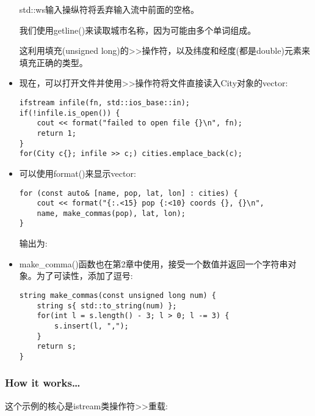 \begin{itemize}
std::ws输入操纵符将丢弃输入流中前面的空格。

我们使用getline()来读取城市名称，因为可能由多个单词组成。

这利用填充(unsigned long)的>{}>操作符，以及纬度和经度(都是double)元素来填充正确的类型。

\item 
现在，可以打开文件并使用>{}>操作符将文件直接读入City对象的vector:

\begin{lstlisting}[style=styleCXX]
ifstream infile(fn, std::ios_base::in);
if(!infile.is_open()) {
	cout << format("failed to open file {}\n", fn);
	return 1;
}
for(City c{}; infile >> c;) cities.emplace_back(c);
\end{lstlisting}

\item 
可以使用format()来显示vector:

\begin{lstlisting}[style=styleCXX]
for (const auto& [name, pop, lat, lon] : cities) {
	cout << format("{:.<15} pop {:<10} coords {}, {}\n",
	name, make_commas(pop), lat, lon);
}
\end{lstlisting}

输出为:


\item 
make\_comma()函数也在第2章中使用，接受一个数值并返回一个字符串对象。为了可读性，添加了逗号:

\begin{lstlisting}[style=styleCXX]
string make_commas(const unsigned long num) {
	string s{ std::to_string(num) };
	for(int l = s.length() - 3; l > 0; l -= 3) {
		s.insert(l, ",");
	}
	return s;
}
\end{lstlisting}
\end{itemize}

\subsubsection{How it works…}

这个示例的核心是istream类操作符>{}>重载:

